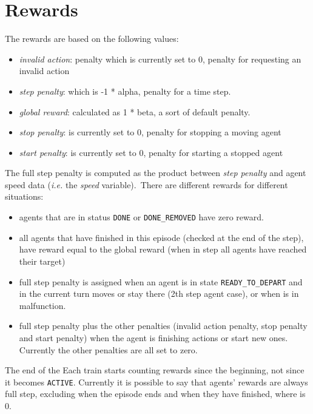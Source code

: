 \section{Rewards}
\label{sec:envRewards}
The rewards are based on the following values:
\begin{itemize}
\item \textit{invalid action}: penalty which is currently set to 0, penalty for requesting an invalid action
\item \textit{step penalty}: which is -1 * alpha, penalty for a time step.
\item \textit{global reward}: calculated as 1 * beta, a sort of default penalty.
\item \textit{stop penalty}: is currently set to 0, penalty for stopping a moving agent
\item \textit{start penalty}: is currently set to 0, penalty for starting a stopped agent
\end{itemize}
The full step penalty is computed as the product between \textit{step penalty} and agent speed data (\textit{i.e.} the \textit{speed} variable).\
There are different rewards for different situations:
\begin{itemize}
\item agents that are in status \texttt{DONE} or \texttt{DONE\_REMOVED} have zero reward.
\item all agents that have finished in this episode (checked at the end of the step), have reward equal to the global reward (when in step all agents have reached their target)

\item full step penalty is assigned when an agent is in state \texttt{READY\_TO\_DEPART} and in the current turn moves or stay there (2th step agent case), or when is in malfunction.
\item full step penalty plus the other penalties (invalid action penalty, stop penalty and start penalty) when the agent is finishing actions or start new ones. Currently the other penalties are all set to zero.
\end{itemize}
The end of the Each train starts counting rewards since the beginning, not since it becomes \texttt{ACTIVE}. Currently it is possible to say that agents’ rewards are always full step, excluding when the episode ends and when they have finished, where is 0.
